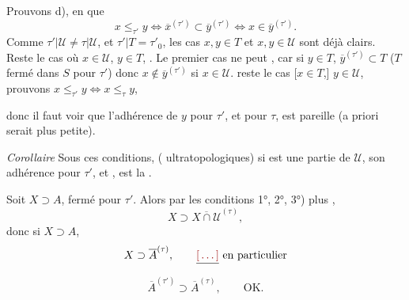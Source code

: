 \documentclass[11pt,a4paper]{article}
\begin{document}
Prouvons d), en  \ill{} que
\[
  x \leq_{\tau'} y \iff \overline{x}^{(\tau')} \subset \overline{y}^{(\tau')} \iff x \in \overline{y}^{(\tau')} .
\]
Comme $\tau'|\mathcal{U} \neq \tau|\mathcal{U}$, et $\tau'|T = \tau'_0$,
les cas $x, y \in T$ et $x, y \in \mathcal{U}$ sont déjà clairs. Reste le cas où \ill{} $x \in \mathcal{U}$, $y \in T$, \ill{}  . Le premier cas ne peut , car si $y \in T$, $\overline{y}^{(\tau')} \subset T$ ($T$ fermé dans $S$ pour $\tau'$) donc $x \notin \overline{y}^{(\tau')}$ 
si $x \in \mathcal{U}$.  reste le cas [$x \in T$,] $y \in \mathcal{U}$, prouvons $x \leq_{\tau'} y \iff x \leq_{\tau} y$,

donc il faut voir que l'adhérence de $y$ pour $\tau'$, et pour $\tau$, est pareille (a priori  serait plus petite). 



\emph{Corollaire} Sous  ces conditions, (\ill{} \ill{} \ill{} \ill{} ultratopologiques) si  est une partie \ill{} de $\mathcal{U}$, son adhérence pour $\tau'$, et \ill{} \ill{} \ill{}, est la . 

\struck{\ill{}} Soit  $X \supset A$, fermé pour $\tau'$. Alors par les conditions 1°, 2°, 3°) plus ,
\[
  X \supset \overline{X \cap \mathcal{U}}^{(\tau)} ,
\]
donc si $X \supset A$,
\[
  X \supset \overline{A}^{(\tau)} , \qquad \struck{\ill{}} \text{ en particulier}
\]
\[
  \overline{A}^{(\tau')} \supset \overline{A}^{(\tau)} , \qquad \text{OK.}
\]
\end{document}
